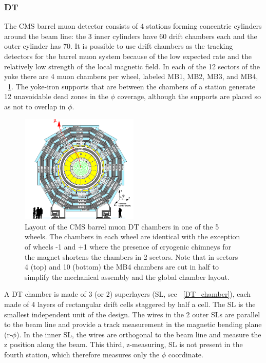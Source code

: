 \subsubsection{DT}
The CMS barrel muon detector consists of 4 stations forming concentric cylinders around the beam line: the 3 inner cylinders have 60 drift chambers each and the outer cylinder has 70. It is possible to use drift chambers as the tracking detectors for the barrel muon system because of the low expected rate and the relatively low strength of the local magnetic field. In each of the 12 sectors of the yoke there are 4 muon chambers per wheel, labeled MB1, MB2, MB3, and MB4, \figurename~\ref{DT}. The yoke-iron supports that are between the chambers of a station generate 12 unavoidable dead zones in the $\phi$ coverage, although the supports are placed so as not to overlap in $\phi$.
\begin{figure}[h!]
 \centering
 \includegraphics[width=0.5\textwidth]{Images/DT.png}
 \caption{Layout of the CMS barrel muon DT chambers in one of the 5 wheels. The chambers in each wheel are identical with the exception of wheels -1 and +1 where the presence of cryogenic chimneys for the magnet shortens the chambers in 2 sectors. Note that in sectors 4 (top) and 10 (bottom) the MB4 chambers are cut in half to simplify the mechanical assembly and the global chamber layout.}
\label{DT}
\end{figure}
A DT chamber is made of 3 (or 2) superlayers (SL, see \figurename~\ref{DT_chamber}), each made of 4 layers of rectangular drift cells staggered by half a cell. The SL is the smallest independent unit of the design. The wires in the 2 outer SLs are parallel to the beam line and provide a track measurement in the magnetic bending plane (r-$\phi$). In the inner SL, the wires are orthogonal to the beam line and measure the z position along the beam. This third, z-measuring, SL is not present in the fourth station, which therefore measures only the $\phi$ coordinate. 
